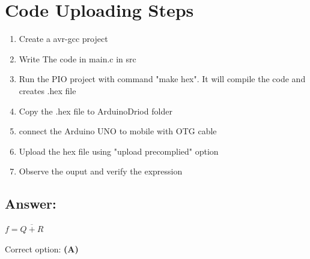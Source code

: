 \documentclass[a4paper,12pt]{article}
\begin{document}
\section*{Code Uploading Steps}
\begin{enumerate}
	\item Create a avr-gcc  project
	\item Write The code in main.c in src
	\item Run the PIO project with command "make hex". It will compile the code and creates .hex file
	\item Copy the .hex file to ArduinoDriod folder
	\item connect the Arduino UNO to mobile with OTG cable
	\item Upload the hex file using "upload precomplied" option
	\item Observe the ouput and verify the expression
\end{enumerate}

\subsection*{Answer:}

$
\boxed{f = \overline{Q + R}}
$

Correct option: \textbf{(A)}
\end{document}
